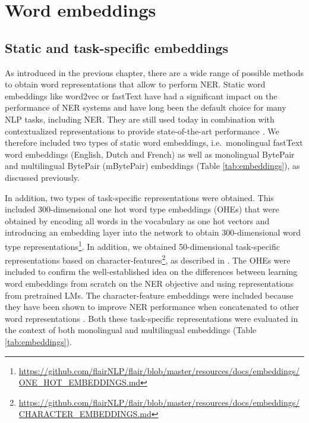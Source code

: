 \documentclass[12pt,a4paper,]{book}
\begin{document}
\hypertarget{word-embeddings}{%
\section{Word embeddings}\label{word-embeddings}}

\hypertarget{static-and-task-specific-embeddings}{%
\subsection{Static and task-specific embeddings}\label{static-and-task-specific-embeddings}}

As introduced in the previous chapter, there are a wide range of possible methods to obtain word representations that allow to perform NER. Static word embeddings like word2vec or fastText have had a significant impact on the performance of NER systems and have long been the default choice for many NLP tasks, including NER. They are still used today in combination with contextualized representations to provide state-of-the-art performance \citep{akbik2018}. We therefore included two types of static word embeddings, i.e.~monolingual fastText word embeddings (English, Dutch and French) as well as monolingual BytePair and multilingual BytePair (mBytePair) embeddings (Table \ref{tab:embeddings}), as discussed previously.

In addition, two types of task-specific representations were obtained. This included 300-dimensional one hot word type embeddings (OHEs) that were obtained by encoding all words in the vocabulary as one hot vectors and introducing an embedding layer into the network to obtain 300-dimensional word type representations\footnote{\url{https://github.com/flairNLP/flair/blob/master/resources/docs/embeddings/ONE_HOT_EMBEDDINGS.md}}. In addition, we obtained 50-dimensional task-specific representations based on character-features\footnote{\url{https://github.com/flairNLP/flair/blob/master/resources/docs/embeddings/CHARACTER_EMBEDDINGS.md}}, as described in \citep{lample2016}. The OHEs were included to confirm the well-established idea on the differences between learning word embeddings from scratch on the NER objective and using representations from pretrained LMs. The character-feature embeddings were included because they have been shown to improve NER performance when concatenated to other word representations \citep{akbik2018, lample2016}. Both these task-specific representations were evaluated in the context of both monolingual and multilingual embeddings (Table \ref{tab:embeddings}).
\end{document}
